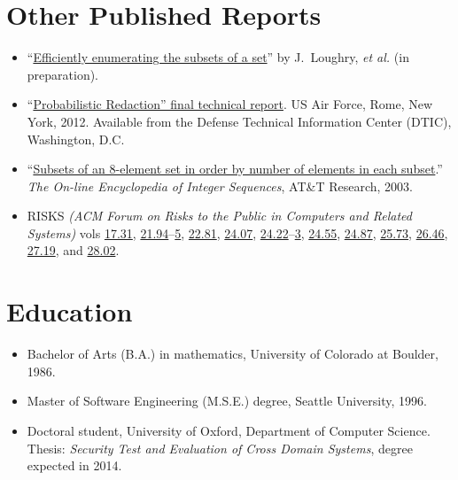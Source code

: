 \documentclass[12pt,twoside,letterpaper]{article}
\begin{document}
\vspace{-8mm}
\section*{Other Published Reports}
\vspace{-2mm}
\begin{itemize}
	\item ``\href{http://www.applied-math.org/subset.pdf}{Efficiently
		enumerating the subsets of a set}'' by J.\ Loughry, {\it et al.}
		(in preparation).

	\item ``\href{http://applied-math.org/Loughry2011.pdf}{Probabilistic
		Redaction'' final technical report}. US Air Force, Rome, New York, 2012.
		Available from the Defense Technical Information Center (DTIC),
		Washington, D.C.

	\item ``\href{http://oeis.org/A047869}{Subsets of an 8-element set
		in order by number of elements in each subset}.'' \emph{The On-line
		Encyclopedia of Integer Sequences}, AT\&T Research, 2003.

    \item RISKS \emph{(ACM Forum on Risks to the Public in Computers
    and Related Systems)} vols
	\href{http://catless.ncl.ac.uk/Risks/17.31.html}{17.31},
	\href{http://catless.ncl.ac.uk/Risks/21.94.html}{21.94}--\href{http://catless.ncl.ac.uk/Risks/21.95.html}{5},
	\href{http://catless.ncl.ac.uk/Risks/21.81.html}{22.81},
	\href{http://catless.ncl.ac.uk/Risks/24.07.html}{24.07},
    \href{http://catless.ncl.ac.uk/Risks/24.22.html}{24.22}--\href{http://catless.ncl.ac.uk/Risks/24.23.html}{3},
	\href{http://catless.ncl.ac.uk/Risks/24.55.html}{24.55},
	\href{http://catless.ncl.ac.uk/Risks/24.87.html}{24.87},
	\href{http://catless.ncl.ac.uk/Risks/25.73.html}{25.73},
	\href{http://catless.ncl.ac.uk/Risks/26.46.html}{26.46},
	\href{http://catless.ncl.ac.uk/Risks/27.19.html}{27.19},
	and \href{http://catless.ncl.ac.uk/Risks/28.02.html}{28.02}.
\end{itemize}

\vspace{-8mm}
\section*{Education}
\vspace{-2mm}
\begin{itemize}
    \item Bachelor of Arts (B.A.) in mathematics,
		University of Colorado at Boulder, 1986.
    \item Master of Software Engineering (M.S.E.) degree,
		Seattle University, 1996.
    \item Doctoral student, University of Oxford, Department of
		Computer Science.  Thesis: \emph{Security Test and
		Evaluation of Cross Domain Systems}, degree expected in 2014.
\end{itemize}
\end{document}
